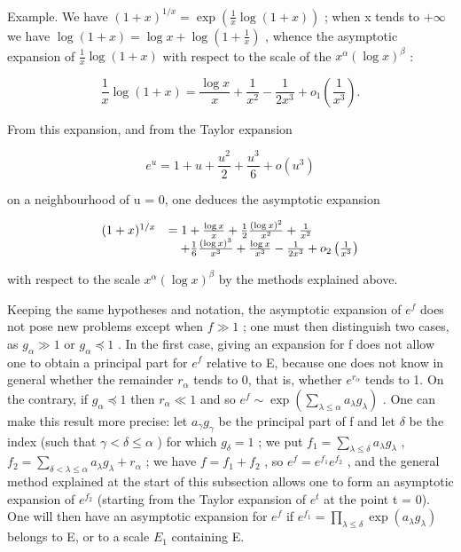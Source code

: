 Example. We have \((1+x)^{1/x}=\exp\left(\frac{1}{x}\log(1+x)\right)\) ; when x tends to \(+\infty\) we have \(\log(1+x)=\log x+\log\left(1+\frac{1}{x}\right)\) , whence the asymptotic expansion of \(\frac{1}{x}\log(1+x)\) with respect to the scale of the \(x^{\alpha}(\log x)^{\beta}\) :

\[
\frac {1}{x} \log (1 + x) = \frac {\log x}{x} + \frac {1}{x ^ {2}} - \frac {1}{2 x ^ {3}} + o _ {1} \left(\frac {1}{x ^ {3}}\right).
\]

From this expansion, and from the Taylor expansion

\[
e ^ {u} = 1 + u + \frac {u ^ {2}}{2} + \frac {u ^ {3}}{6} + o (u ^ {3})
\]

on a neighbourhood of u = 0, one deduces the asymptotic expansion

\[
\begin{array}{r l} (1 + x) ^ {1 / x} & = 1 + \frac {\log x}{x} + \frac {1}{2} \frac {(\log x) ^ {2}}{x ^ {2}} + \frac {1}{x ^ {2}} \\ & \quad + \frac {1}{6} \frac {(\log x) ^ {3}}{x ^ {3}} + \frac {\log x}{x ^ {3}} - \frac {1}{2 x ^ {3}} + o _ {2} \left(\frac {1}{x ^ {3}}\right) \end{array}
\]

with respect to the scale \(x^{\alpha}(\log x)^{\beta}\) by the methods explained above.

Keeping the same hypotheses and notation, the asymptotic expansion of \(e^{f}\) does not pose new problems except when \(f \gg 1\) ; one must then distinguish two cases, as \(g_{\alpha} \gg 1\) or \(g_{\alpha} \preccurlyeq 1\) . In the first case, giving an expansion for f does not allow one to obtain a principal part for \(e^{f}\) relative to E, because one does not know in general whether the remainder \(r_{\alpha}\) tends to 0, that is, whether \(e^{r_{\alpha}}\) tends to 1. On the contrary, if \(g_{\alpha} \preccurlyeq 1\) then \(r_{\alpha} \ll 1\) and so \(e^{f} \sim \exp\left(\sum_{\lambda \leqslant \alpha} a_{\lambda} g_{\lambda}\right)\) . One can make this result more precise: let \(a_{\gamma} g_{\gamma}\) be the principal part of f and let \(\delta\) be the index (such that \(\gamma < \delta \leqslant \alpha\) ) for which \(g_{\delta} = 1\) ; we put \(f_{1} = \sum_{\lambda \leqslant \delta} a_{\lambda} g_{\lambda}\) , \(f_{2} = \sum_{\delta < \lambda \leqslant \alpha} a_{\lambda} g_{\lambda} + r_{\alpha}\) ; we have \(f = f_{1} + f_{2}\) , so \(e^{f} = e^{f_{1}} e^{f_{2}}\) , and the general method explained at the start of this subsection allows one to form an asymptotic expansion of \(e^{f_{2}}\) (starting from the Taylor expansion of \(e^{t}\) at the point t = 0). One will then have an asymptotic expansion for \(e^{f}\) if \(e^{f_{1}} = \prod_{\lambda \leqslant \delta} \exp(a_{\lambda} g_{\lambda})\) belongs to E, or to a scale \(E_{1}\) containing E.

